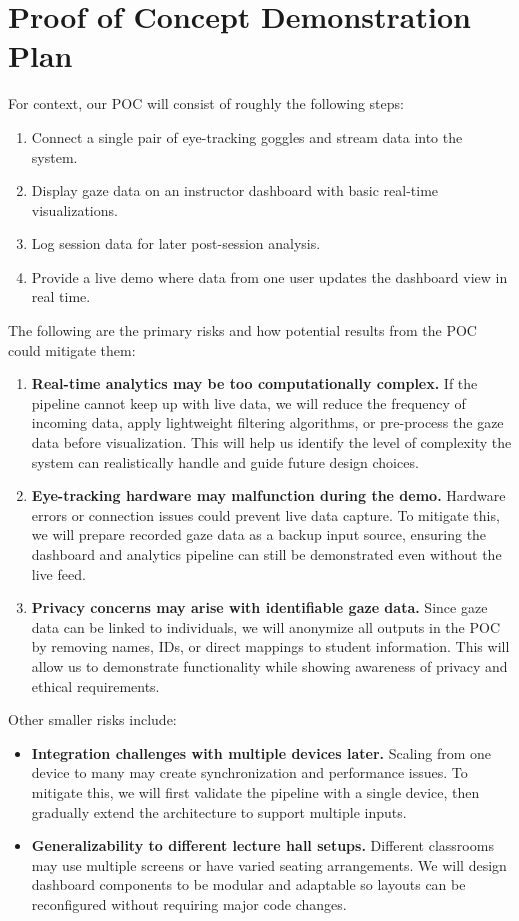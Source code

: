 \documentclass{article}
\begin{document}
\section{Proof of Concept Demonstration Plan}

For context, our POC will consist of roughly the following steps:
\begin{enumerate}
  \item Connect a single pair of eye-tracking goggles and stream data into the system.
  \item Display gaze data on an instructor dashboard with basic real-time visualizations.
  \item Log session data for later post-session analysis.
  \item Provide a live demo where data from one user updates the dashboard view in real time.
\end{enumerate}

\noindent
The following are the primary risks and how potential results from the POC could mitigate them:
\begin{enumerate}
  \item \textbf{Real-time analytics may be too computationally complex.} If the pipeline cannot keep up with live data, we will reduce the frequency of incoming data, apply lightweight filtering algorithms, or pre-process the gaze data before visualization. This will help us identify the level of complexity the system can realistically handle and guide future design choices.
  \item \textbf{Eye-tracking hardware may malfunction during the demo.} Hardware errors or connection issues could prevent live data capture. To mitigate this, we will prepare recorded gaze data as a backup input source, ensuring the dashboard and analytics pipeline can still be demonstrated even without the live feed.
  \item \textbf{Privacy concerns may arise with identifiable gaze data.} Since gaze data can be linked to individuals, we will anonymize all outputs in the POC by removing names, IDs, or direct mappings to student information. This will allow us to demonstrate functionality while showing awareness of privacy and ethical requirements.
\end{enumerate}

Other smaller risks include:
\begin{itemize}
  \item \textbf{Integration challenges with multiple devices later.} Scaling from one device to many may create synchronization and performance issues. To mitigate this, we will first validate the pipeline with a single device, then gradually extend the architecture to support multiple inputs.
  \item \textbf{Generalizability to different lecture hall setups.} Different classrooms may use multiple screens or have varied seating arrangements. We will design dashboard components to be modular and adaptable so layouts can be reconfigured without requiring major code changes.
\end{itemize}
\end{document}

